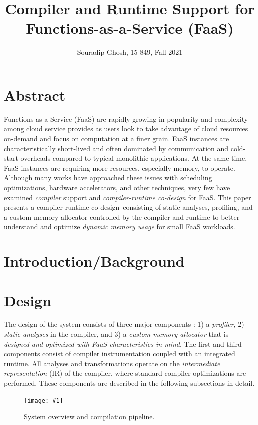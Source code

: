 \documentclass{article}
\title{Compiler and Runtime Support for Functions-as-a-Service (FaaS)}
\date{}
\author{Souradip Ghosh, 15-849, Fall 2021}
\def\pagefig#1{\texttt{[image: \#1]}}
\def\crcd{compiler-runtime co-design}
\begin{document}
\maketitle

\section{Abstract}
Functions-as-a-Service (FaaS) are rapidly growing in popularity and 
complexity among cloud service provides as users look to take 
advantage of cloud resources on-demand and focus on computation
at a finer grain. FaaS instances are characteristically short-lived
and often dominated by communication and cold-start overheads compared
to typical monolithic applications. At the same time, FaaS instances
are requiring more resources, especially memory, to operate. Although
many works have approached these issues with scheduling optimizations,
hardware accelerators, and other techniques, very few have examined
\textit{compiler} support and \textit{\crcd} for FaaS. This paper presents 
a \crcd\ consisting of static analyses, profiling, and a custom memory 
allocator controlled by the compiler and runtime to better understand 
and optimize \textit{dynamic memory usage} for small FaaS workloads.

\section{Introduction/Background}

\section{Design}
The design of the system consists of three major components : 1) a \textit{profiler},
2) \textit{static analyses} in the compiler, and 3) a \textit{custom memory allocator}
that is \textit{designed and optimized with FaaS characteristics in mind}. The first and third components consist 
of compiler instrumentation coupled with an integrated runtime. All analyses and 
transformations operate on the \textit{intermediate representation} (IR) of the compiler, 
where standard compiler optimizations are performed. These components are described in 
the following subsections in detail. 

\begin{figure}
    \centerline{\pagefig{figs/sys.pdf}}
    \caption{System overview and compilation pipeline. }  
	\label{fig:sys}
\end{figure}
\end{document}
